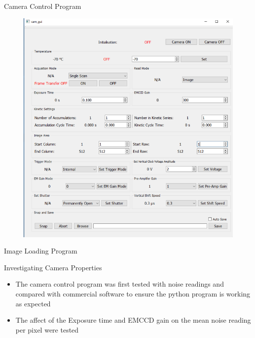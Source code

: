 \documentclass{beamer}
\begin{document}
\begin{frame}{Camera Control Program}

\begin{figure}
\centering
\includegraphics[scale=0.4]{Figures/cam_program.PNG}
\end{figure}


\end{frame}

\begin{frame}{Image Loading Program}


\begin{center}
\end{center}

\end{frame}

\begin{frame}{Investigating Camera Properties}

\begin{itemize}
\item The camera control program was first tested with noise readings and compared with commercial software to ensure the python program is working as expected
\bigskip
\item The affect of the Exposure time and EMCCD gain on the mean noise reading per pixel were tested

\end{itemize}



\end{frame}
\end{document}
